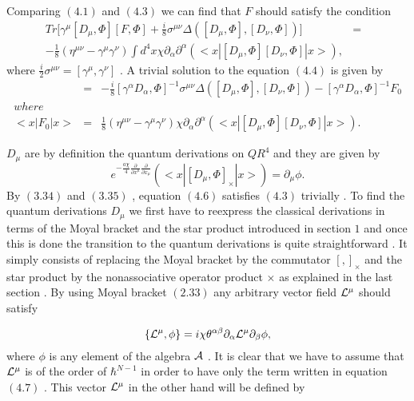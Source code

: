\documentclass[a4paper,12pt]{article}
\begin{document}
Comparing $(4.1)$ and $(4.3)$ we can find that $F$ should satisfy
the condition
\begin{eqnarray}
Tr\bigg[{\gamma}^{\mu}[D_{\mu},{\Phi}][F,\Phi] +
\frac{i}{8}{\sigma}^{{\mu}{\nu}}{\Delta}([D_{\mu},\Phi],[D_{\nu},\Phi])\bigg]&=&\nonumber\\-\frac{1}{8}({\eta}^{{\mu}{\nu}}-{\gamma}^{\mu}{\gamma}^{\nu})\int
d^4x{\chi}
{\partial}_{\alpha}{\partial}^{\alpha}(<x|[D_{\mu},\Phi][D_{\nu},\Phi]|x>),
\end{eqnarray}
where
$\frac{i}{2}{\sigma}^{{\mu}{\nu}}=[{\gamma}^{\mu},{\gamma}^{\nu}]$
. A trivial solution to the equation $(4.4)$ is given by
\begin{eqnarray}
[F,{\Phi}]&=&-\frac{i}{8}[{\gamma}^{\alpha}D_{\alpha},\Phi]^{-1}{\sigma}^{{\mu}{\nu}}{\Delta}([D_{\mu},\Phi],[D_{\nu},\Phi])
- [{\gamma}^{\alpha}D_{\alpha},\Phi]^{-1}F_0\nonumber\\
where\nonumber\\
<x|F_0|x>&=&\frac{1}{8}({\eta}^{{\mu}{\nu}}-{\gamma}^{\mu}{\gamma}^{\nu}){\chi}{\partial}_{\alpha}{\partial}^{\alpha}(<x|[D_{\mu},\Phi][D_{\nu},\Phi]|x>).
\end{eqnarray}

$D_{\mu}$ are by definition the quantum derivations on $QR^4$ and
they are given by
\begin{equation}
e^{-\frac{a{\chi}}{4}{\frac{\partial}{{\partial}x^{\mu}}}{\frac{\partial}{{\partial}x_{\mu}}}}(<x|[D_{\mu},\Phi]_{\times}|x>)={\partial}_{\mu}{\phi}.
\end{equation}
By $(3.34)$ and $(3.35)$ , equation $(4.6)$ satisfies $(4.3)$
trivially . To find the quantum derivations $D_{\mu}$ we first
have to reexpress the classical derivations in terms of the Moyal
bracket and the star product introduced in section $1$ and once
this is done the transition to the quantum derivations is quite
straightforward . It simply consists of replacing the Moyal
bracket by the commutator $[,]_{\times}$ and the star product by
the nonassociative operator product ${\times}$ as explained in the
last section . By using Moyal bracket $(2.33)$ any arbitrary
vector field ${\cal L}^{\mu}$ should satisfy

\begin{equation}
\{{\cal
L}^{\mu},\phi\}=i{\chi}{\theta}^{{\alpha}{\beta}}{\partial}_{\alpha}{\cal
L}^{\mu}{\partial}_{\beta}\phi,
\end{equation}
where $\phi$ is any element of the algebra ${\cal A}$ . It is
clear that we have to assume that ${\cal L}^{\mu}$ is of the
order of ${\hbar}^{N-1}$ in order to have only the term written
in equation $(4.7)$ . This vector ${\cal L}^{\mu}$ in the other
hand will be defined by
\end{document}
